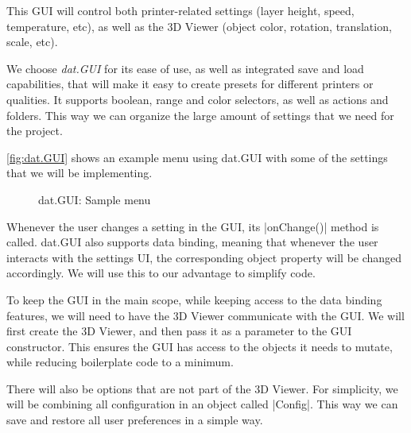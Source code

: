 This GUI will control both printer-related settings (layer height, speed, temperature, etc), as well as the 3D Viewer (object color, rotation, translation, scale, etc).

We choose \emph{dat.GUI} \cite{dat.GUI} for its ease of use, as well as integrated save and load capabilities, that will make it easy to create presets for different printers or qualities. It supports boolean, range and color selectors, as well as actions and folders. This way we can organize the large amount of settings that we need for the project. 

\autoref{fig:dat.GUI} shows an example menu using dat.GUI with some of the settings that we will be implementing.

\begin{figure}[H]
    \noindent{}
    \caption{dat.GUI: Sample menu}
    \label{fig:dat.GUI}
\end{figure}


Whenever the user changes a setting in the GUI, its \code|onChange()| method is called. dat.GUI also supports data binding, meaning that whenever the user interacts with the settings UI, the corresponding object property will be changed accordingly. We will use this to our advantage to simplify code.

To keep the GUI in the main scope, while keeping access to the data binding features, we will need to have the 3D Viewer communicate with the GUI. We will first create the 3D Viewer, and then pass it as a parameter to the GUI constructor. This ensures the GUI has access to the objects it needs to mutate, while reducing boilerplate code to a minimum. 

There will also be options that are not part of the 3D Viewer. For simplicity, we will be combining all configuration in an object called \code|Config|. This way we can save and restore all user preferences in a simple way.


